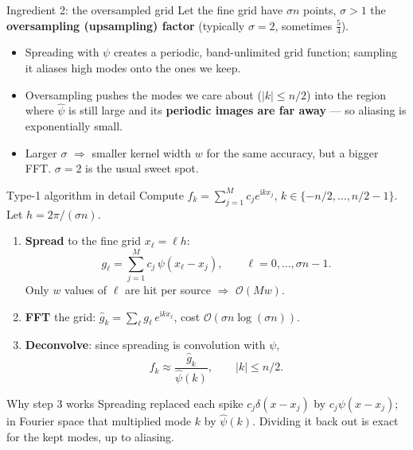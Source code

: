 \documentclass[aspectratio=169,11pt]{beamer}
\newcommand{\cO}{\mathcal{O}}
\newcommand{\ii}{\mathrm i}
\newcommand{\x}{\bm{x}}
\newcommand{\hl}[1]{{\color{CCMorange}\textbf{#1}}}
\begin{document}
\begin{frame}{Ingredient 2: the oversampled grid}
\small
Let the fine grid have \(\sigma n\) points, \(\sigma>1\) the \hl{oversampling (upsampling) factor} (typically \(\sigma=2\), sometimes \(\tfrac54\)).
\begin{itemize}
  \item Spreading with \(\psi\) creates a periodic, band-unlimited grid function; sampling it aliases high modes onto the ones we keep.
  \item Oversampling pushes the modes we care about (\(|k|\le n/2\)) into the region where \(\widehat\psi\) is still large and its \hl{periodic images are far away} --- so aliasing is exponentially small.
  \item Larger \(\sigma\) \(\Rightarrow\) smaller kernel width \(w\) for the same accuracy, but a bigger FFT. \(\sigma=2\) is the usual sweet spot.
\end{itemize}
\begin{center}
\end{center}
\end{frame}

\begin{frame}{Type-1 algorithm in detail}
\footnotesize
Compute \(\displaystyle f_k=\sum_{j=1}^M c_j e^{\ii k x_j}\),
\(k\in\{-n/2,\dots,n/2-1\}\). Let \(h=2\pi/(\sigma n)\).

\begin{enumerate}
  \item \hl{Spread} to the fine grid \(x_\ell=\ell h\):
  \[
    g_\ell=\sum_{j=1}^M c_j\,\psi(x_\ell-x_j),\qquad \ell=0,\dots,\sigma n-1 .
  \]
  Only \(w\) values of \(\ell\) are hit per source \(\Rightarrow\) \(\cO(Mw)\).
  \item \hl{FFT} the grid: \(\widehat g_k=\sum_\ell g_\ell\, e^{\ii k x_\ell}\), cost \(\cO(\sigma n\log(\sigma n))\).
  \item \hl{Deconvolve}: since spreading is convolution with \(\psi\),
  \[
    f_k\approx \frac{\widehat g_k}{\widehat\psi(k)},\qquad |k|\le n/2 .
  \]
\end{enumerate}
\begin{block}{Why step 3 works}
Spreading replaced each spike \(c_j\delta(x-x_j)\) by \(c_j\psi(x-x_j)\); in Fourier space that multiplied mode \(k\) by \(\widehat\psi(k)\). Dividing it back out is exact for the kept modes, up to aliasing.
\end{block}
\end{frame}
\end{document}

